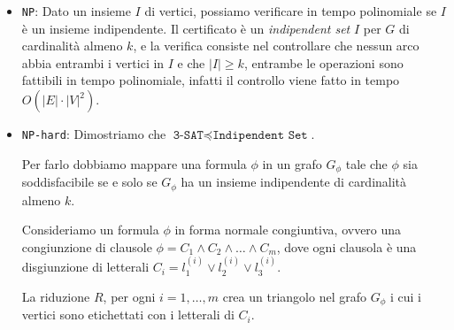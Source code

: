\begin{itemize}
    \item \texttt{NP}: Dato un insieme $I$ di vertici, possiamo verificare in tempo polinomiale
    se $I$ è un insieme indipendente. Il certificato è un \textit{indipendent set} $I$ per 
    $G$ di cardinalità almeno $k$, e la verifica consiste nel controllare che nessun arco abbia
    entrambi i vertici in $I$ e che $|I| \geq k$, entrambe le operazioni sono fattibili in tempo
    polinomiale, infatti il controllo viene fatto in tempo $O(|E| \cdot |V|^2)$.
    \item \texttt{NP-hard}: Dimostriamo che $\texttt{3-SAT} \preceq  \texttt{Indipendent Set}$.
    
    Per farlo dobbiamo mappare una formula $\phi$ in un grafo $G_\phi$ tale che $\phi$ sia soddisfacibile
    se e solo se $G_\phi$ ha un insieme indipendente di cardinalità almeno $k$.

    Consideriamo un formula $\phi$ in forma normale congiuntiva, ovvero una congiunzione di clausole
    $\phi = C_1 \land C_2 \land \ldots \land C_m$, dove ogni clausola è una disgiunzione di letterali
    $C_i = l_{1}^{(i)} \lor l_{2}^{(i)} \lor l_{3}^{(i)}$.

    La riduzione $R$, per ogni $i = 1, \ldots, m$ crea un triangolo nel grafo $G_\phi$ i cui i vertici sono 
    etichettati con i letterali di $C_i$.
    \begin{figure}[H]
        \centering 
\end{figure}
\end{itemize}
